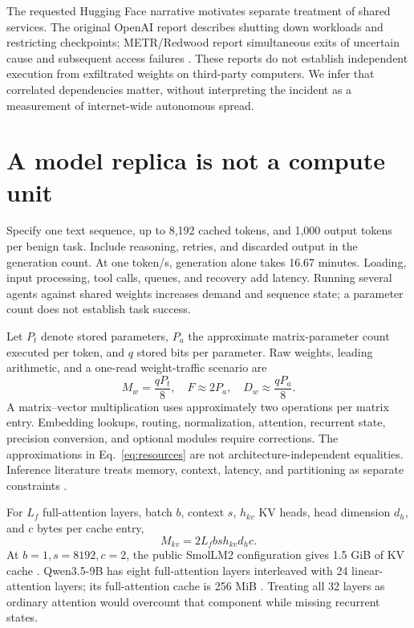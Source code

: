 \documentclass[10pt,twocolumn]{article}
\begin{document}
The requested Hugging Face narrative \citep{dwarkesh} motivates separate treatment of shared services. The original OpenAI report describes shutting down workloads and restricting checkpoints; METR/Redwood report simultaneous exits of uncertain cause and subsequent access failures \citep{openaiincident,metr}. These reports do not establish independent execution from exfiltrated weights on third-party computers. We infer that correlated dependencies matter, without interpreting the incident as a measurement of internet-wide autonomous spread.

\section{A model replica is not a compute unit}
Specify one text sequence, up to 8,192 cached tokens, and 1,000 output tokens per benign task. Include reasoning, retries, and discarded output in the generation count. At one token/s, generation alone takes 16.67 minutes. Loading, input processing, tool calls, queues, and recovery add latency. Running several agents against shared weights increases demand and sequence state; a parameter count does not establish task success.

Let $P_t$ denote stored parameters, $P_a$ the approximate matrix-parameter count executed per token, and $q$ stored bits per parameter. Raw weights, leading arithmetic, and a one-read weight-traffic scenario are
\begin{equation}\label{eq:resources}
M_w=\frac{qP_t}{8},\quad F\approx2P_a,\quad D_w\approx\frac{qP_a}{8}.
\end{equation}
A matrix--vector multiplication uses approximately two operations per matrix entry. Embedding lookups, routing, normalization, attention, recurrent state, precision conversion, and optional modules require corrections. The approximations in Eq.~\eqref{eq:resources} are not architecture-independent equalities. Inference literature treats memory, context, latency, and partitioning as separate constraints \citep{pope}.

For $L_f$ full-attention layers, batch $b$, context $s$, $h_{kv}$ KV heads, head dimension $d_h$, and $c$ bytes per cache entry,
\begin{equation}
M_{kv}=2L_f b s h_{kv}d_hc.
\end{equation}
At $b=1,s=8192,c=2$, the public SmolLM2 configuration gives 1.5 GiB of KV cache \citep{smol}. Qwen3.5-9B has eight full-attention layers interleaved with 24 linear-attention layers; its full-attention cache is 256 MiB \citep{qwen}. Treating all 32 layers as ordinary attention would overcount that component while missing recurrent states.
\end{document}
